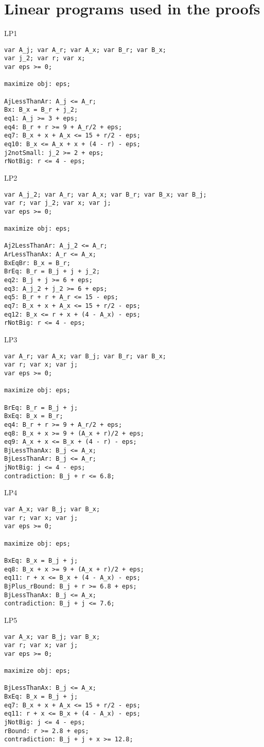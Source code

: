 \section{Linear programs used in the proofs}\label{app:LP}
LP1
\begin{verbatim}
var A_j; var A_r; var A_x; var B_r; var B_x;
var j_2; var r; var x;
var eps >= 0;

maximize obj: eps;

AjLessThanAr: A_j <= A_r;
Bx: B_x = B_r + j_2;
eq1: A_j >= 3 + eps;
eq4: B_r + r >= 9 + A_r/2 + eps;
eq7: B_x + x + A_x <= 15 + r/2 - eps;
eq10: B_x <= A_x + x + (4 - r) - eps;
j2notSmall: j_2 >= 2 + eps;
rNotBig: r <= 4 - eps;
\end{verbatim}
LP2
\begin{verbatim}
var A_j_2; var A_r; var A_x; var B_r; var B_x; var B_j;
var r; var j_2; var x; var j;
var eps >= 0;

maximize obj: eps;

Aj2LessThanAr: A_j_2 <= A_r;
ArLessThanAx: A_r <= A_x;
BxEqBr: B_x = B_r;
BrEq: B_r = B_j + j + j_2;
eq2: B_j + j >= 6 + eps;
eq3: A_j_2 + j_2 >= 6 + eps;
eq5: B_r + r + A_r <= 15 - eps;
eq7: B_x + x + A_x <= 15 + r/2 - eps;
eq12: B_x <= r + x + (4 - A_x) - eps; 
rNotBig: r <= 4 - eps;
\end{verbatim} 
LP3
\begin{verbatim}
var A_r; var A_x; var B_j; var B_r; var B_x; 
var r; var x; var j;
var eps >= 0;

maximize obj: eps;

BrEq: B_r = B_j + j;
BxEq: B_x = B_r;
eq4: B_r + r >= 9 + A_r/2 + eps;
eq8: B_x + x >= 9 + (A_x + r)/2 + eps;
eq9: A_x + x <= B_x + (4 - r) - eps;
BjLessThanAx: B_j <= A_x;
BjLessThanAr: B_j <= A_r;
jNotBig: j <= 4 - eps;
contradiction: B_j + r <= 6.8;
\end{verbatim}
LP4
\begin{verbatim}
var A_x; var B_j; var B_x; 
var r; var x; var j;
var eps >= 0;

maximize obj: eps;

BxEq: B_x = B_j + j;
eq8: B_x + x >= 9 + (A_x + r)/2 + eps;
eq11: r + x <= B_x + (4 - A_x) - eps;
BjPlus_rBound: B_j + r >= 6.8 + eps;
BjLessThanAx: B_j <= A_x;
contradiction: B_j + j <= 7.6;
\end{verbatim}
LP5
\begin{verbatim}
var A_x; var B_j; var B_x; 
var r; var x; var j;
var eps >= 0;

maximize obj: eps;

BjLessThanAx: B_j <= A_x;
BxEq: B_x = B_j + j;
eq7: B_x + x + A_x <= 15 + r/2 - eps;
eq11: r + x <= B_x + (4 - A_x) - eps; 
jNotBig: j <= 4 - eps;
rBound: r >= 2.8 + eps;
contradiction: B_j + j + x >= 12.8;
\end{verbatim}
